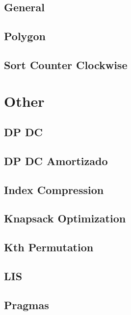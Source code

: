 \subsection{	General}
\raggedbottom
\hrulefill
\subsection{	Polygon}
\raggedbottom
\hrulefill
\subsection{	Sort Counter Clockwise}
\raggedbottom
\hrulefill

\section{Other}
\subsection{	DP DC}
\raggedbottom
\hrulefill
\subsection{	DP DC Amortizado}
\raggedbottom
\hrulefill
\subsection{	Index Compression}
\raggedbottom
\hrulefill
\subsection{	Knapsack Optimization}
\raggedbottom
\hrulefill
\subsection{	Kth Permutation}
\raggedbottom
\hrulefill
\subsection{	LIS}
\raggedbottom
\hrulefill
\subsection{	Pragmas}
\raggedbottom
\hrulefill
